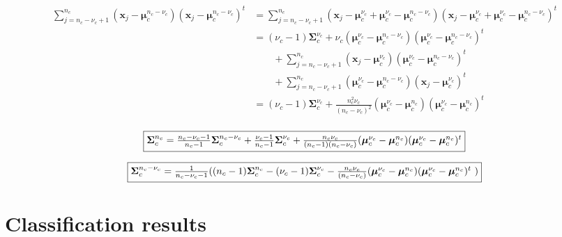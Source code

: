 \documentclass[a4paper,11pt,DIV=16,abstracton]{scrartcl}
\begin{document}
        \begin{align*}
            \sum_{j = n_c-\nu_c+1}^{n_c} (\mathbf{x}_j - \boldsymbol{\mu}_c^{n_c-\nu_c}) (\mathbf{x}_j - \boldsymbol{\mu}_c^{n_c-\nu_c})^t
                &= \sum_{j = n_c-\nu_c+1}^{n_c} (\mathbf{x}_j - \boldsymbol{\mu}_c^{\nu_c} + \boldsymbol{\mu}_c^{\nu_c} - \boldsymbol{\mu}_c^{n_c-\nu_c}) (\mathbf{x}_j - \boldsymbol{\mu}_c^{\nu_c} + \boldsymbol{\mu}_c^{\nu_c} - \boldsymbol{\mu}_c^{n_c-\nu_c})^t\\
                &= (\nu_c-1) \boldsymbol{\Sigma}_c^{\nu_c} + \nu_c (\boldsymbol{\mu}_c^{\nu_c}-\boldsymbol{\mu}_c^{n_c-\nu_c})(\boldsymbol{\mu}_c^{\nu_c}-\boldsymbol{\mu}_c^{n_c-\nu_c})^t\\
                &\qquad + \sum_{j = n_c-\nu_c+1}^{n_c} (\mathbf{x}_j - \boldsymbol{\mu}_c^{\nu_c}) (\boldsymbol{\mu}_c^{\nu_c} - \boldsymbol{\mu}_c^{n_c-\nu_c})^t\\
                &\qquad + \sum_{j = n_c-\nu_c+1}^{n_c} (\boldsymbol{\mu}_c^{\nu_c} - \boldsymbol{\mu}_c^{n_c-\nu_c}) (\mathbf{x}_j - \boldsymbol{\mu}_c^{\nu_c})^t\\
                &= (\nu_c-1) \boldsymbol{\Sigma}_c^{\nu_c} + \frac{n_c^2 \nu_c}{(n_c-\nu_c)^2} (\boldsymbol{\mu}_c^{\nu_c}-\boldsymbol{\mu}_c^{n_c})(\boldsymbol{\mu}_c^{\nu_c}-\boldsymbol{\mu}_c^{n_c})^t \\
        \end{align*}

        \begin{equation}
            \fbox{$\boldsymbol{\Sigma}_c^{n_c} = \frac{n_c-\nu_c-1}{n_c-1} \boldsymbol{\Sigma}_c^{n_c-\nu_c} + \frac{\nu_c-1}{n_c-1} \boldsymbol{\Sigma}_c^{\nu_c} + \frac{n_c \nu_c}{(n_c-1)(n_c-\nu_c)} (\boldsymbol{\mu}_c^{\nu_c}-\boldsymbol{\mu}_c^{n_c})(\boldsymbol{\mu}_c^{\nu_c}-\boldsymbol{\mu}_c^{n_c})^t$}
        \end{equation}

        \begin{equation}
            \fbox{$\boldsymbol{\Sigma}_c^{n_c-\nu_c} = \frac{1}{n_c-\nu_c-1} ( (n_c-1) \boldsymbol{\Sigma}_c^{n_c} - (\nu_c-1) \boldsymbol{\Sigma}_c^{\nu_c} - \frac{n_c \nu_c}{(n_c-\nu_c)} (\boldsymbol{\mu}_c^{\nu_c}-\boldsymbol{\mu}_c^{n_c})(\boldsymbol{\mu}_c^{\nu_c}-\boldsymbol{\mu}_c^{n_c})^t$ )}
        \end{equation}


\section{Classification results}
\end{document}
